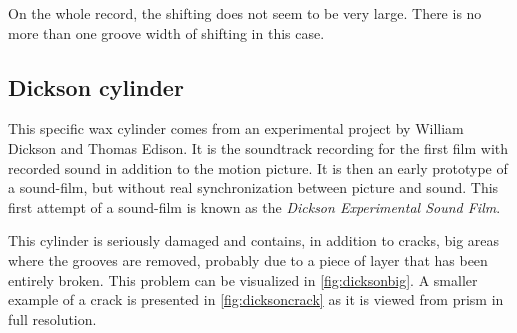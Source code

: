 On the whole record, the shifting does not seem to be very large. There is no more than one groove width of shifting in this case.

\subsection{Dickson cylinder}

This specific wax cylinder comes from an experimental project by William Dickson and Thomas Edison. It is the soundtrack recording for the first film with recorded sound in addition to the motion picture. It is then an early prototype of a sound-film, but without real synchronization between picture and sound. This first attempt of a sound-film is known as the \emph{Dickson Experimental Sound Film}.

This cylinder is seriously damaged and contains, in addition to cracks, big areas where the grooves are removed, probably due to a piece of layer that has been entirely broken. This problem can be visualized in \autoref{fig:dicksonbig}. A smaller example of a crack is presented in \autoref{fig:dicksoncrack} as it is viewed from \gls{prism} in full resolution.

